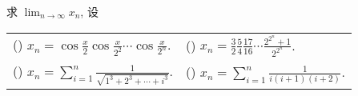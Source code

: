 \begin{example}
    求 $\displaystyle\lim_{n\to\infty}x_n$, 设
    \setcounter{magicrownumbers}{0}
    \begin{table}[H]
        \centering
        \begin{tabular}{l | l}
            (\rownumber{}) $\displaystyle x_n=\cos\frac{x}{2}\cos\frac{x}{2^2}\cdots\cos\frac{x}{2^n}$. & (\rownumber{}) $\displaystyle x_n=\frac{3}{2}\frac{5}{4}\frac{17}{16}\cdots\frac{2^{2^n}+1}{2^{2^n}}$. \\
            (\rownumber{}) $\displaystyle x_n=\sum_{i=1}^n\frac{1}{\sqrt{1^3+2^3+\cdots+i^3}}$.         & (\rownumber{}) $\displaystyle x_n=\sum_{i=1}^n\frac{1}{i(i+1)(i+2)}$.
        \end{tabular}
    \end{table}
\end{example}
